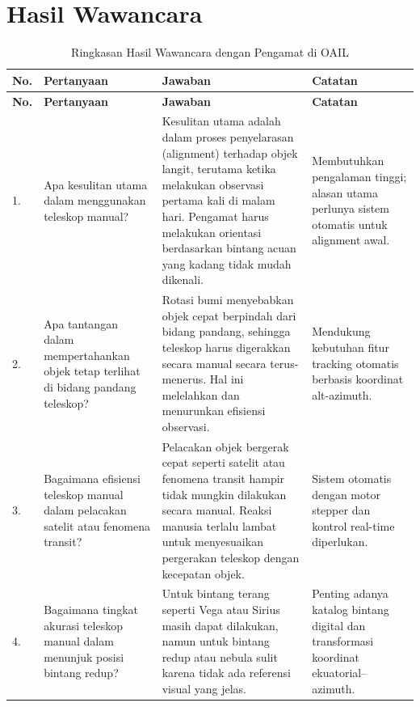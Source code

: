
\section{Hasil Wawancara}
\begin{longtable}{| b{} | p{} | p{} | p{} |}
	\caption{Ringkasan Hasil Wawancara dengan Pengamat di OAIL}
	\label{lampiran:wawancaraOAIL}\\
	\hline
	\textbf{No.} & \textbf{Pertanyaan} & \textbf{Jawaban} & \textbf{Catatan} \\
	\hline
	\endfirsthead
	
	\hline
	\textbf{No.} & \textbf{Pertanyaan} & \textbf{Jawaban} & \textbf{Catatan} \\
	\hline
	\endhead
	
	1. & Apa kesulitan utama dalam menggunakan teleskop manual? &
	Kesulitan utama adalah dalam proses penyelarasan (alignment) terhadap objek langit, terutama ketika melakukan observasi pertama kali di malam hari. Pengamat harus melakukan orientasi berdasarkan bintang acuan yang kadang tidak mudah dikenali. &
	Membutuhkan pengalaman tinggi; alasan utama perlunya sistem otomatis untuk alignment awal. \\
	\hline
	
	2. & Apa tantangan dalam mempertahankan objek tetap terlihat di bidang pandang teleskop? &
	Rotasi bumi menyebabkan objek cepat berpindah dari bidang pandang, sehingga teleskop harus digerakkan secara manual secara terus-menerus. Hal ini melelahkan dan menurunkan efisiensi observasi. &
	Mendukung kebutuhan fitur tracking otomatis berbasis koordinat alt-azimuth. \\
	\hline
	
	3. & Bagaimana efisiensi teleskop manual dalam pelacakan satelit atau fenomena transit? &
	Pelacakan objek bergerak cepat seperti satelit atau fenomena transit hampir tidak mungkin dilakukan secara manual. Reaksi manusia terlalu lambat untuk menyesuaikan pergerakan teleskop dengan kecepatan objek. &
	Sistem otomatis dengan motor stepper dan kontrol real-time diperlukan. \\
	\hline
	
	4. & Bagaimana tingkat akurasi teleskop manual dalam menunjuk posisi bintang redup? &
	Untuk bintang terang seperti Vega atau Sirius masih dapat dilakukan, namun untuk bintang redup atau nebula sulit karena tidak ada referensi visual yang jelas. &
	Penting adanya katalog bintang digital dan transformasi koordinat ekuatorial–azimuth. \\
	\hline
	

\end{longtable}
